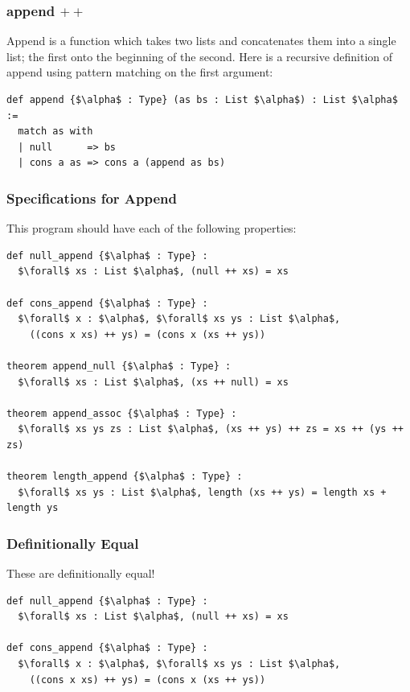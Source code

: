\documentclass{beamer}
\theoremstyle{indentDefn} \newtheorem{defn}[]{Definition}
\begin{document}
\begin{frame}[fragile]
	\frametitle{append $++$}
	
	Append is a function which takes two lists and concatenates them into a single list; the first onto the beginning of the second. Here is a recursive definition of append using pattern matching on the first argument: 
	
	\begin{lstlisting}[language=Lean]
def append {$\alpha$ : Type} (as bs : List $\alpha$) : List $\alpha$ :=
  match as with
  | null      => bs
  | cons a as => cons a (append as bs)	
	\end{lstlisting}
	
\vspace{30mm}

\end{frame}

\begin{frame}[fragile]
	\frametitle{Specifications for Append}
	
	This program should have each of the following properties:
	
	\begin{lstlisting}[language=Lean]
def null_append {$\alpha$ : Type} :
  $\forall$ xs : List $\alpha$, (null ++ xs) = xs 

def cons_append {$\alpha$ : Type} :
  $\forall$ x : $\alpha$, $\forall$ xs ys : List $\alpha$,
    ((cons x xs) ++ ys) = (cons x (xs ++ ys))

theorem append_null {$\alpha$ : Type} :
  $\forall$ xs : List $\alpha$, (xs ++ null) = xs

theorem append_assoc {$\alpha$ : Type} :
  $\forall$ xs ys zs : List $\alpha$, (xs ++ ys) ++ zs = xs ++ (ys ++ zs)
  
theorem length_append {$\alpha$ : Type} :
  $\forall$ xs ys : List $\alpha$, length (xs ++ ys) = length xs + length ys

	\end{lstlisting}
\end{frame}
	
\begin{frame}[fragile]
	\frametitle{Definitionally Equal}
	
	These are definitionally equal!
	
	\begin{lstlisting}[language=Lean]
def null_append {$\alpha$ : Type} :
  $\forall$ xs : List $\alpha$, (null ++ xs) = xs 

def cons_append {$\alpha$ : Type} :
  $\forall$ x : $\alpha$, $\forall$ xs ys : List $\alpha$,
    ((cons x xs) ++ ys) = (cons x (xs ++ ys))
	\end{lstlisting}
	
	\vspace{40mm}

\end{frame}
\end{document}
